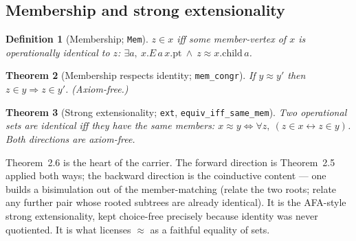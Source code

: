 \documentclass[11pt]{article}
\newtheorem{thm}{Theorem}[section]
\newtheorem{defn}[thm]{Definition}
\theoremstyle{remark}
\newcommand{\eq}{\approx}
\begin{document}
\subsection{Membership and strong extensionality}
\begin{defn}[Membership; \texttt{Mem}]
$z\in x$ iff some member-vertex of $x$ is operationally identical to $z$:
$\exists a,\ x.E\,a\,x.\mathrm{pt}\ \wedge\ z\eq x.\mathrm{child}\,a$.
\end{defn}
\begin{thm}[Membership respects identity; \texttt{mem\_congr}]
If $y\eq y'$ then $z\in y\Rightarrow z\in y'$. (Axiom-free.)
\end{thm}
\begin{thm}[Strong extensionality; \texttt{ext}, \texttt{equiv\_iff\_same\_mem}]
Two operational sets are identical iff they have the same members:
$x\eq y \iff \forall z,\ (z\in x \leftrightarrow z\in y)$. Both directions are axiom-free.
\end{thm}
Theorem~2.6 is the heart of the carrier. The forward direction is Theorem~2.5 applied both ways;
the backward direction is the coinductive content --- one builds a bisimulation out of the
member-matching (relate the two roots; relate any further pair whose rooted subtrees are already
identical). It is the AFA-style strong extensionality, kept choice-free precisely because identity
was never quotiented. It is what licenses $\eq$ as a faithful equality of sets.

\end{document}
